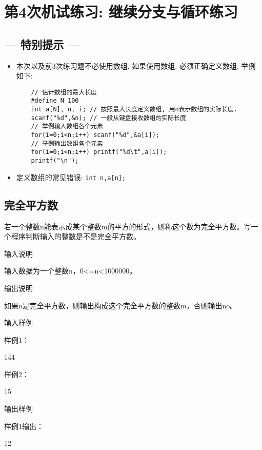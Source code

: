 %
%
%
\chapter{第4次机试练习: 继续分支与循环练习}

\section*{--- 特别提示 ---}

\begin{itemize}
	\item 本次以及前3次练习题不必使用数组, 如果使用数组, 必须正确定义数组, 举例如下:
	\begin{lstlisting}
	// 估计数组的最大长度
	#define N 100 
	int a[N], n, i; // 按照最大长度定义数组, 用n表示数组的实际长度.
	scanf("%d",&n); // 一般从键盘接收数组的实际长度
	// 举例输入数组各个元素
	for(i=0;i<n;i++) scanf("%d",&a[i]);
	// 举例输出数组各个元素
	for(i=0;i<n;i++) printf("%d\t",a[i]);
	printf("\n");
	\end{lstlisting}
	
	\item 定义数组的常见错误: \lstinline|int n,a[n];| 
\end{itemize}

\section{完全平方数}
若一个整数n能表示成某个整数m的平方的形式，则称这个数为完全平方数。写一个程序判断输入的整数是不是完全平方数。

输入说明
	
输入数据为一个整数n，0<=n<1000000。

输出说明
	
如果n是完全平方数，则输出构成这个完全平方数的整数m，否则输出no。

输入样例
	
样例1：

144

样例2：

15

输出样例
	
样例1输出：

12

